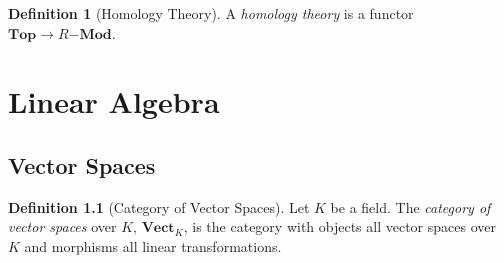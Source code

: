\documentclass{book}
\theoremstyle{definition}
\newtheorem{definition}[lemma]{Definition}
\begin{document}
\begin{definition}[Homology Theory]
    A \emph{homology theory} is a functor $\mathbf{Top} \rightarrow R \mathbf{-Mod}$.
\end{definition}

\chapter{Linear Algebra}

\section{Vector Spaces}

\begin{definition}[Category of Vector Spaces]
    Let $K$ be a field. The \emph{category of vector spaces} over $K$, $\mathbf{Vect}_K$,
    is the category with objects all vector spaces over $K$ and morphisms all linear transformations.
\end{definition}
\end{document}
